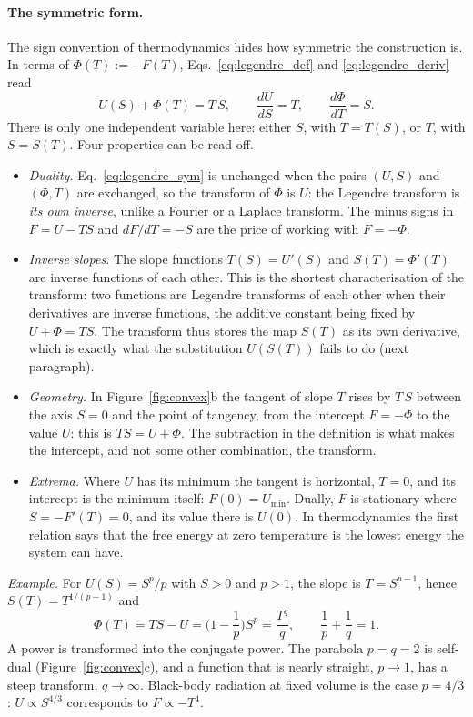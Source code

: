 \documentclass[10pt,a4paper]{article}
\theoremstyle{remark}
\begin{document}
\paragraph{The symmetric form.} The sign convention of thermodynamics hides how
symmetric the construction is. In terms of $\Phi(T):=-F(T)$,
Eqs.~\eqref{eq:legendre_def} and \eqref{eq:legendre_deriv} read~\cite{Zia}
\begin{equation}\label{eq:legendre_sym}
  U(S)+\Phi(T)=T\,S ,\qquad \frac{dU}{dS}=T ,\qquad \frac{d\Phi}{dT}=S .
\end{equation}
There is only one independent variable here: either $S$, with $T=T(S)$, or $T$,
with $S=S(T)$. Four properties can be read off.
\begin{itemize}
\item \emph{Duality.} Eq.~\eqref{eq:legendre_sym} is unchanged when the pairs
$(U,S)$ and $(\Phi,T)$ are exchanged, so the transform of $\Phi$ is $U$: the
Legendre transform is \emph{its own inverse}, unlike a Fourier or a Laplace
transform. The minus signs in $F=U-TS$ and $dF/dT=-S$ are the price of
working with $F=-\Phi$.
\item \emph{Inverse slopes.} The slope functions $T(S)=U'(S)$ and
$S(T)=\Phi'(T)$ are inverse functions of each other. This is the shortest
characterisation of the transform: two functions are Legendre transforms of
each other when their derivatives are inverse functions, the additive constant
being fixed by $U+\Phi=TS$. The transform thus stores the map $S(T)$ as its own
derivative, which is exactly what the substitution $U(S(T))$ fails to do
(next paragraph).
\item \emph{Geometry.} In Figure~\ref{fig:convex}b the tangent of slope $T$
rises by $T\,S$ between the axis $S=0$ and the point of tangency, from the
intercept $F=-\Phi$ to the value $U$: this is $TS=U+\Phi$. The subtraction in
the definition is what makes the intercept, and not some other combination,
the transform.
\item \emph{Extrema.} Where $U$ has its minimum the tangent is horizontal,
$T=0$, and its intercept is the minimum itself: $F(0)=U_{\min}$. Dually, $F$
is stationary where $S=-F'(T)=0$, and its value there is $U(0)$. In
thermodynamics the first relation says that the free energy at zero
temperature is the lowest energy the system can have.
\end{itemize}
\emph{Example.} For $U(S)=S^{p}/p$ with $S>0$ and $p>1$, the slope is
$T=S^{p-1}$, hence $S(T)=T^{1/(p-1)}$ and
\[
  \Phi(T)=TS-U=\Big(1-\frac1p\Big)S^{p}=\frac{T^{q}}{q} ,\qquad
  \frac1p+\frac1q=1 .
\]
A power is transformed into the conjugate power. The parabola $p=q=2$ is
self-dual (Figure~\ref{fig:convex}c), and a function that is nearly straight,
$p\to1$, has a steep transform, $q\to\infty$. Black-body radiation at fixed
volume is the case $p=4/3$: $U\propto S^{4/3}$ corresponds to $F\propto-T^{4}$.
\end{document}
